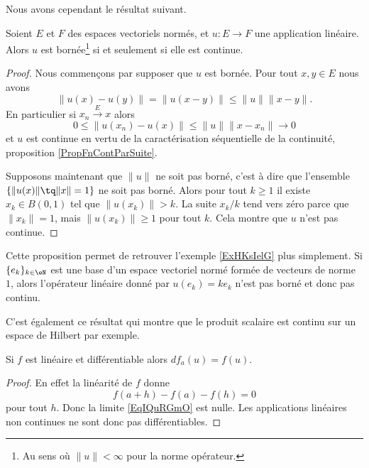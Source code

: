 Nous avons cependant le résultat suivant.
\begin{proposition} \label{PropmEJjLE}
    Soient \( E\) et \( F\) des espaces vectoriels normés, et \( u\colon E\to F\) une application linéaire. Alors \( u\) est bornée\footnote{Au sens où \( \| u \|<\infty\) pour la norme opérateur.} si et seulement si elle est continue.
\end{proposition}

\begin{proof}
    Nous commençons par supposer que \( u\) est bornée. Pour tout \( x,y\in E\) nous avons
    \begin{equation}
        \| u(x)-u(y) \|=\| u(x-y) \|\leq \| u \|\| x-y \|.
    \end{equation}
    En particulier si \( x_n\stackrel{E}{\longrightarrow}x\) alors
    \begin{equation}
        0\leq \| u(x_n)-u(x) \|\leq \| u \|\| x-x_n \|\to 0
    \end{equation}
    et \( u\) est continue en vertu de la caractérisation séquentielle de la continuité, proposition \ref{PropFnContParSuite}.

Supposons maintenant que \( \| u \|\) ne soit pas borné, c'est à dire que l'ensemble \( \{ \| u(x) \|\tq \| x \|=1 \}\) ne soit pas borné. Alors pour tout \( k\geq 1\) il existe \( x_k\in B(0,1)\) tel que \( \| u(x_k) \|>k\). La suite \( x_k/k\) tend vers zéro parce que \( \| x_k \|=1\), mais \( \| u(x_k) \|\geq 1\) pour tout \( k\). Cela montre que \( u\) n'est pas continue.
\end{proof}
Cette proposition permet de retrouver l'exemple \ref{ExHKsIelG} plus simplement. Si \( \{ e_k \}_{k\in \eN}\) est une base d'un espace vectoriel normé formée de vecteurs de norme \( 1\), alors l'opérateur linéaire donné par \( u(e_k)=ke_k\) n'est pas borné et donc pas continu.

C'est également ce résultat qui montre que le produit scalaire est continu sur un espace de Hilbert par exemple.

\begin{lemma}
    Si \( f\) est linéaire et différentiable alors \( df_a(u)=f(u)\).
\end{lemma}

\begin{proof}
    En effet la linéarité de \( f\) donne
    \begin{equation}
        f(a+h)-f(a)-f(h)=0
    \end{equation}
    pour tout \( h\). Donc la limite \eqref{EqIQuRGmO} est nulle. Les applications linéaires non continues ne sont donc pas différentiables.
\end{proof}

